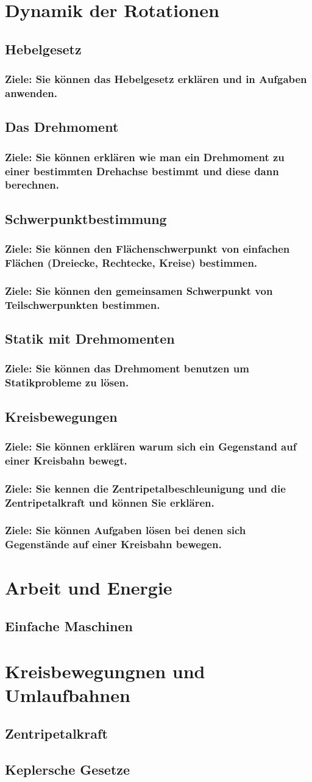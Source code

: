 \documentclass[11pt,a4paper,twoside]{article}
\newcommand{\Oberthema}[1]{\newpage\section{#1}}
\newcommand{\Unterthema}[1]{\subsection{#1}}
\newcommand{\Ziele}[1]{\subsubsection*{Ziele: #1}}
\begin{document}
\Oberthema{Dynamik der Rotationen}
	\Unterthema{Hebelgesetz}
	\Ziele{Sie können das Hebelgesetz erklären und in Aufgaben anwenden.}
	
	\Unterthema{Das Drehmoment}
	\Ziele{Sie können erklären wie man ein Drehmoment zu einer bestimmten Drehachse bestimmt und diese dann berechnen.}
	
	\Unterthema{Schwerpunktbestimmung}
	\Ziele{Sie können den Flächenschwerpunkt von einfachen Flächen (Dreiecke, Rechtecke, Kreise) bestimmen.}
	\Ziele{Sie können den gemeinsamen Schwerpunkt von Teilschwerpunkten bestimmen.}
	
	\Unterthema{Statik mit Drehmomenten}
	\Ziele{Sie können das Drehmoment benutzen um Statikprobleme zu lösen.}

	\Unterthema{Kreisbewegungen}
	\Ziele{Sie können erklären warum sich ein Gegenstand auf einer Kreisbahn bewegt.}
	\Ziele{Sie kennen die Zentripetalbeschleunigung und die Zentripetalkraft und können Sie erklären.}
	\Ziele{Sie können Aufgaben lösen bei denen sich Gegenstände auf einer Kreisbahn bewegen.}

\Oberthema{Arbeit und Energie}
	\Unterthema{Einfache Maschinen}


\Oberthema{Kreisbewegungnen und Umlaufbahnen}
	\Unterthema{Zentripetalkraft}
	\Unterthema{Keplersche Gesetze}
\end{document}
